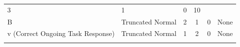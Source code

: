 \documentclass[11pt,]{article}
\begin{document}
\begin{longtable}[]{@{}llcccc@{}}
\begin{minipage}[t]{0.08\columnwidth}
3\strut
\end{minipage} & \begin{minipage}[t]{0.06\columnwidth}\centering\strut
1\strut
\end{minipage} & \begin{minipage}[t]{0.09\columnwidth}\centering\strut
0\strut
\end{minipage} & \begin{minipage}[t]{0.09\columnwidth}\centering\strut
10\strut
\end{minipage}\tabularnewline
\begin{minipage}[t]{0.28\columnwidth}\raggedright\strut
B\strut
\end{minipage} & \begin{minipage}[t]{0.20\columnwidth}\raggedright\strut
Truncated Normal\strut
\end{minipage} & \begin{minipage}[t]{0.08\columnwidth}\centering\strut
2\strut
\end{minipage} & \begin{minipage}[t]{0.06\columnwidth}\centering\strut
1\strut
\end{minipage} & \begin{minipage}[t]{0.09\columnwidth}\centering\strut
0\strut
\end{minipage} & \begin{minipage}[t]{0.09\columnwidth}\centering\strut
None\strut
\end{minipage}\tabularnewline
\begin{minipage}[t]{0.28\columnwidth}\raggedright\strut
v (Correct Ongoing Task Response)\strut
\end{minipage} & \begin{minipage}[t]{0.20\columnwidth}\raggedright\strut
Truncated Normal\strut
\end{minipage} & \begin{minipage}[t]{0.08\columnwidth}\centering\strut
1\strut
\end{minipage} & \begin{minipage}[t]{0.06\columnwidth}\centering\strut
2\strut
\end{minipage} & \begin{minipage}[t]{0.09\columnwidth}\centering\strut
0\strut
\end{minipage} & \begin{minipage}[t]{0.09\columnwidth}\centering\strut
None\strut
\end{minipage}\tabularnewline
\begin{minipage}[t]{0.28\columnwidth}\raggedright\strut

\end{minipage}
\end{longtable}
\end{document}
